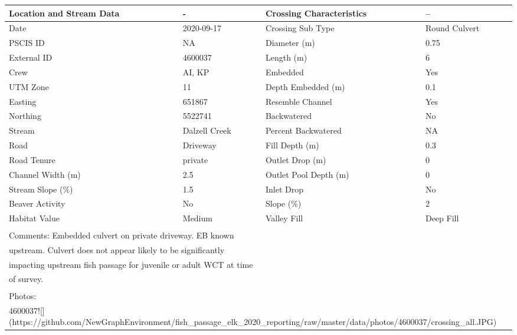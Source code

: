 \documentclass[
]{book}
\begin{document}
\begin{tabular}{l|l|l|l}
\hline
Location and Stream Data & - & Crossing Characteristics & --\\
\hline
Date & 2020-09-17 & Crossing Sub Type & Round Culvert\\
\hline
PSCIS ID & NA & Diameter (m) & 0.75\\
\hline
External ID & 4600037 & Length (m) & 6\\
\hline
Crew & AI, KP & Embedded & Yes\\
\hline
UTM Zone & 11 & Depth Embedded (m) & 0.1\\
\hline
Easting & 651867 & Resemble Channel & Yes\\
\hline
Northing & 5522741 & Backwatered & No\\
\hline
Stream & Dalzell Creek & Percent Backwatered & NA\\
\hline
Road & Driveway & Fill Depth (m) & 0.3\\
\hline
Road Tenure & private & Outlet Drop (m) & 0\\
\hline
Channel Width (m) & 2.5 & Outlet Pool Depth (m) & 0\\
\hline
Stream Slope (\%) & 1.5 & Inlet Drop & No\\
\hline
Beaver Activity & No & Slope (\%) & 2\\
\hline
Habitat Value & Medium & Valley Fill & Deep Fill\\
\hline
\multicolumn{4}{l}{\textsuperscript{} Comments: Embedded culvert on private driveway. EB known}\\
\multicolumn{4}{l}{upstream. Culvert does not appear likely to be significantly}\\
\multicolumn{4}{l}{impacting upstream fish passage for juvenile or adult WCT at time}\\
\multicolumn{4}{l}{of survey.}\\
\multicolumn{4}{l}{\textsuperscript{} Photos:}\\
\multicolumn{4}{l}{4600037![](https://github.com/NewGraphEnvironment/fish\_passage\_elk\_2020\_reporting/raw/master/data/photos/4600037/crossing\_all.JPG)}\\
\end{tabular}
\end{document}
